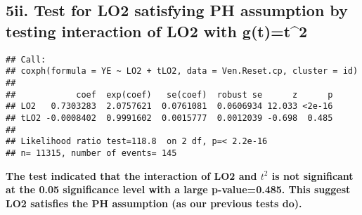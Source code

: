\documentclass[
]{article}
\newenvironment{Shaded}{\begin{snugshade}}{\end{snugshade}}
\newcommand{\AttributeTok}[1]{\textcolor[rgb]{0.77,0.63,0.00}{#1}}
\newcommand{\CommentTok}[1]{\textcolor[rgb]{0.56,0.35,0.01}{\textit{#1}}}
\newcommand{\DecValTok}[1]{\textcolor[rgb]{0.00,0.00,0.81}{#1}}
\newcommand{\FunctionTok}[1]{\textcolor[rgb]{0.00,0.00,0.00}{#1}}
\newcommand{\NormalTok}[1]{#1}
\newcommand{\OtherTok}[1]{\textcolor[rgb]{0.56,0.35,0.01}{#1}}
\newcommand{\SpecialCharTok}[1]{\textcolor[rgb]{0.00,0.00,0.00}{#1}}
\newcommand{\StringTok}[1]{\textcolor[rgb]{0.31,0.60,0.02}{#1}}
\begin{document}
\begin{Shaded}
\end{Shaded}

\hypertarget{ii.-test-for-lo2-satisfying-ph-assumption-by-testing-interaction-of-lo2-with-gtt2}{%
\subsection{5ii. Test for LO2 satisfying PH assumption by testing
interaction of LO2 with
g(t)=t\^{}2}\label{ii.-test-for-lo2-satisfying-ph-assumption-by-testing-interaction-of-lo2-with-gtt2}}

\begin{Shaded}
\end{Shaded}

\begin{verbatim}
## Call:
## coxph(formula = YE ~ LO2 + tLO2, data = Ven.Reset.cp, cluster = id)
## 
##            coef  exp(coef)   se(coef)  robust se      z      p
## LO2   0.7303283  2.0757621  0.0761081  0.0606934 12.033 <2e-16
## tLO2 -0.0008402  0.9991602  0.0015777  0.0012039 -0.698  0.485
## 
## Likelihood ratio test=118.8  on 2 df, p=< 2.2e-16
## n= 11315, number of events= 145
\end{verbatim}

\textbf{The test indicated that the interaction of LO2 and \(t^2\) is
not significant at the 0.05 significance level with a large
p-value=0.485. This suggest LO2 satisfies the PH assumption (as our
previous tests do).}
\end{document}
